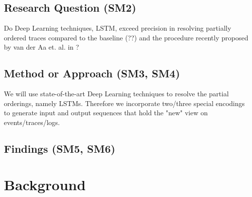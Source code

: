 \documentclass[
	a4paper,
	pagesize,
	pdftex,
	12pt,
	ngerman,
	fleqn,
	final,
	]{scrartcl}
\theoremstyle{plain}
\theoremstyle{definition}
\begin{document}
	\subsection{Research Question (SM2)}\label{sec:introduction::research-question}
	Do Deep Learning techniques, LSTM, exceed precision in resolving partially ordered traces compared to the baseline (??) and the procedure recently proposed by van der Aa et. al. in \cite{self}?
	
	\subsection{Method or Approach (SM3, SM4)}\label{sec:introduction::method}
	We will use state-of-the-art Deep Learning techniques to resolve the partial orderings, namely LSTMs. Therefore we incorporate two/three special encodings to generate input and output sequences that hold the "new" view on events/traces/logs. 
	
	\subsection{Findings (SM5, SM6)}\label{sec:introduction::results}

\section{Background}
\end{document}
